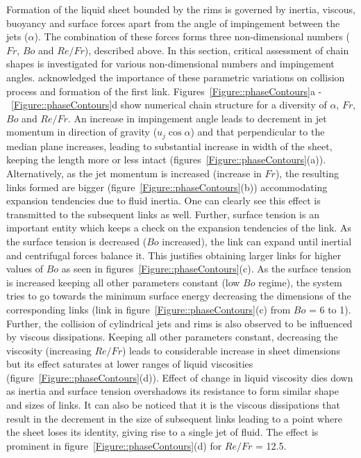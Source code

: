 \documentclass{jfm}
\begin{document}
Formation of the liquid sheet bounded by the rims is governed by inertia, viscous, buoyancy and surface forces apart from the angle of impingement between the jets ($\alpha$). The combination of these forces forms three non-dimensional numbers ($Fr$, $Bo$ and $Re/Fr$), described above. In this section, critical assessment of chain shapes is investigated for various non-dimensional numbers and impingement angles. \cite{yang2014liquid} acknowledged the importance of these parametric variations on collision process and formation of the first link. Figures~\ref{Figure::phaseContours}a -~\ref{Figure::phaseContours}d show numerical chain structure for a diversity of $\alpha$, $Fr$, $Bo$ and $Re/Fr$. An increase in impingement angle leads to decrement in jet momentum in direction of gravity ($u_j\cos\alpha$) and that perpendicular to the median plane increases, leading to substantial increase in width of the sheet, keeping the length more or less intact (figures~\ref{Figure::phaseContours}(a)). Alternatively, as the jet momentum is increased (increase in $Fr$), the resulting links formed are bigger (figure~\ref{Figure::phaseContours}(b)) accommodating expansion tendencies due to fluid inertia. One can clearly see this effect is transmitted to the subsequent links as well. Further, surface tension is an important entity which keeps a check on the expansion tendencies of the link. As the surface tension is decreased ($Bo$ increased), the link can expand until inertial and centrifugal forces balance it. This justifies obtaining larger links for higher values of $Bo$ as seen in figures~\ref{Figure::phaseContours}(c). As the surface tension is increased keeping all other parameters constant (low $Bo$ regime), the system tries to go towards the minimum surface energy decreasing the dimensions of the corresponding links (link in figure~\ref{Figure::phaseContours}(c) from $Bo$ = 6 to 1). Further, the collision of cylindrical jets and rims is also observed to be influenced by viscous dissipations. Keeping all other parameters constant, decreasing the viscosity (increasing $Re/Fr$) leads to considerable increase in sheet dimensions but its effect saturates at lower ranges of liquid viscosities (figure~\ref{Figure::phaseContours}(d)). Effect of change in liquid viscosity dies down as inertia and surface tension overshadows its resistance to form similar shape and sizes of links. It can also be noticed that it is the viscous dissipations that result in the decrement in the size of subsequent links leading to a point where the sheet loses its identity, giving rise to a single jet of fluid. The effect is prominent in figure~\ref{Figure::phaseContours}(d) for $Re/Fr$ = 12.5.\\
\end{document}
